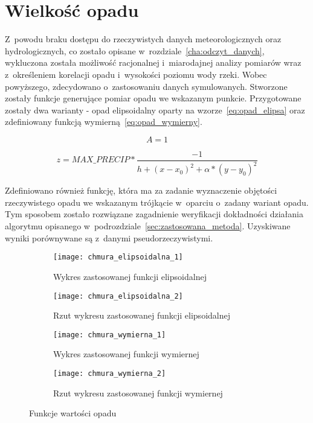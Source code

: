 \section{Wielkość opadu}
Z~powodu braku dostępu do rzeczywistych danych meteorologicznych oraz hydrologicznych, co zostało opisane w~rozdziale~\ref{cha:odczyt_danych}, wykluczona została możliwość racjonalnej i~miarodajnej analizy pomiarów wraz z~określeniem korelacji opadu i~wysokości poziomu wody rzeki. Wobec powyższego, zdecydowano o~zastosowaniu danych symulowanych. Stworzone zostały funkcje generujące pomiar opadu we wskazanym punkcie. Przygotowane zostały dwa warianty - opad elipsoidalny oparty na wzorze~\ref{eq:opad_elipsa} oraz zdefiniowany funkcją wymierną~\ref{eq:opad_wymierny}.

\begin{equation}
A = 1%
\label{eq:opad_elipsa}
\end{equation}

\begin{equation}
z = MAX\_PRECIP * \frac{-1}{h+(x-x_0)^2 + \alpha * (y-y_0)^2}
\label{eq:opad_wymierny}
\end{equation}

Zdefiniowano również funkcję, która ma za zadanie wyznaczenie objętości rzeczywistego opadu we wskazanym trójkącie w~oparciu o~zadany wariant opadu. Tym sposobem zostało rozwiązane zagadnienie weryfikacji dokładności działania algorytmu opisanego w~podrozdziale~\ref{sec:zastosowana_metoda}. Uzyskiwane wyniki porównywane są z~danymi pseudorzeczywistymi.

\begin{figure}[ht]
\centering
	\begin{subfigure}{.5\textwidth}
		\centering
		\texttt{[image: chmura\_elipsoidalna\_1]}
		\caption{Wykres zastosowanej funkcji elipsoidalnej}
		\label{fig:elipsa_3d}
	\end{subfigure}%
	\begin{subfigure}{0.5\textwidth}
		\centering
		\texttt{[image: chmura\_elipsoidalna\_2]}
		\caption{Rzut wykresu zastosowanej funkcji elipsoidalnej}
		\label{fig:elipsa_2d}
	\end{subfigure}	
	
	\begin{subfigure}{.5\textwidth}
		\centering
		\texttt{[image: chmura\_wymierna\_1]}
		\caption{Wykres zastosowanej funkcji wymiernej}
		\label{fig:elipsa_3d}
	\end{subfigure}%
	\begin{subfigure}{0.5\textwidth}
		\centering
		\texttt{[image: chmura\_wymierna\_2]}
		\caption{Rzut wykresu zastosowanej funkcji wymiernej}
		\label{fig:elipsa_2d}
	\end{subfigure}	
\caption{Funkcje wartości opadu}
\end{figure}

